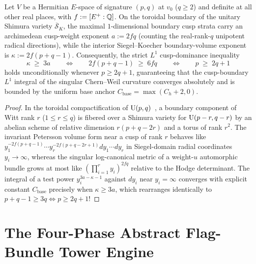 \begin{lemma}
\label{lem:13:isotropic-bootstrap}
Let $V$ be a Hermitian $E$-space of signature $(p, q)$ at $v_0$ ($q \ge 2$) and definite at all other real places, with $f := [E^+ : \mathbb{Q}]$. On the toroidal boundary of the unitary Shimura variety $\overline{\mathcal{S}}_K$, the maximal $1$-dimensional boundary cusp strata carry an archimedean cusp-weight exponent $a := 2 f q$ (counting the real-rank-$q$ unipotent radical directions), while the interior Siegel--Koecher boundary-volume exponent is $\kappa := 2 f (p + q - 1)$. Consequently, the strict $L^1$ cusp-dominance inequality
\begin{equation}
\label{eq:13:bootstrap-ineq}
  \kappa \;\ge\; 3 a \qquad\Longleftrightarrow\qquad 2 f (p + q - 1) \;\ge\; 6 f q \qquad\Longleftrightarrow\qquad p \;\ge\; 2q + 1
\end{equation}
holds unconditionally whenever $p \ge 2q + 1$, guaranteeing that the cusp-boundary $L^1$ integral of the singular Chern--Weil curvature converges absolutely and is bounded by the uniform base anchor $C_{\mathrm{base}} = \max(C_h + 2, 0)$.
\end{lemma}

\begin{proof}
In the toroidal compactification of $\mathrm{U}(p, q)$~\cite{Lan2013}, a boundary component of Witt rank $r$ ($1 \le r \le q$) is fibered over a Shimura variety for $\mathrm{U}(p - r, q - r)$ by an abelian scheme of relative dimension $r(p + q - 2r)$ and a torus of rank $r^2$. The invariant Petersson volume form near a cusp of rank $r$ behaves like $y_1^{-2f(p+q-1)} \cdots y_r^{-2f(p+q-2r+1)} dy_1 \cdots dy_r$ in Siegel-domain radial coordinates $y_i \to \infty$, whereas the singular log-canonical metric of a weight-$u$ automorphic bundle grows at most like $(\prod_{i=1}^r y_i)^{2fq}$ relative to the Hodge determinant. The integral of a test power $y_i^{3a - \kappa - 1}$ against $dy_i$ near $y_i = \infty$ converges with explicit constant $C_{\mathrm{base}}$ precisely when $\kappa \ge 3a$, which rearranges identically to $p + q - 1 \ge 3q \iff p \ge 2q + 1$!
\end{proof}

\section{The Four-Phase Abstract Flag-Bundle Tower Engine}
\label{sec:13:four-phase}

